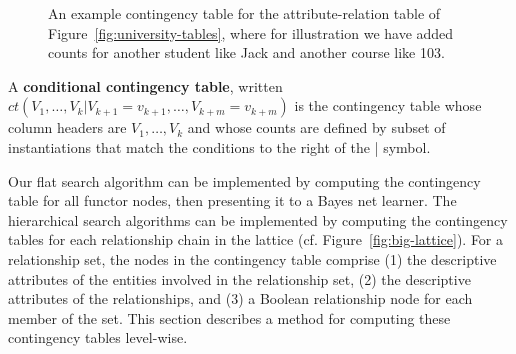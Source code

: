 \documentclass{article}
\newcommand{\ct}{\mathit{ct}}
\begin{document}
\begin{figure}[tb]
\begin{center}
\caption{An example contingency table for the attribute-relation table of Figure~\ref{fig:university-tables}, where for illustration we have added counts for another student like Jack and another course like 103.
\label{fig:ct}}
\end{center}
\end{figure}

A \textbf{conditional contingency table}, written $\ct(V_{1},\ldots,V_{k}|V_{k+1} = v_{k+1},\ldots, V_{k+m} = v_{k+m})$
is the contingency table whose column headers are $V_{1},\ldots,V_{k}$ and whose counts are  defined by subset of instantiations that match the conditions to the right of the | symbol. 

Our flat search algorithm can be implemented by computing the contingency table for all functor nodes, then presenting it to a Bayes net learner. The hierarchical search algorithms can be implemented by computing the contingency tables for each relationship chain in the lattice (cf. Figure~\ref{fig:big-lattice}). For a relationship set, the nodes in the contingency table comprise (1) the descriptive attributes of the entities involved in the relationship set, (2) the descriptive attributes of the relationships, and (3) a Boolean relationship node for each member of the set. This section describes a method for computing these contingency tables level-wise.
\end{document}
